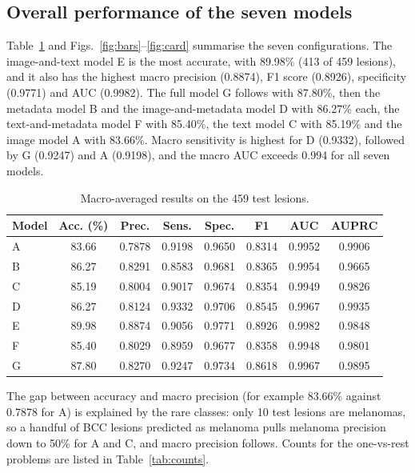 \documentclass[conference]{IEEEtran}
\begin{document}
\subsection{Overall performance of the seven models}
Table~\ref{tab:main} and Figs.~\ref{fig:bars}--\ref{fig:card} summarise the seven configurations. The image-and-text model E is the most accurate, with 89.98\% (413 of 459 lesions), and it also has the highest macro precision (0.8874), F1 score (0.8926), specificity (0.9771) and AUC (0.9982). The full model G follows with 87.80\%, then the metadata model B and the image-and-metadata model D with 86.27\% each, the text-and-metadata model F with 85.40\%, the text model C with 85.19\% and the image model A with 83.66\%. Macro sensitivity is highest for D (0.9332), followed by G (0.9247) and A (0.9198), and the macro AUC exceeds 0.994 for all seven models.

\begin{table}[!t]
\caption{Macro-averaged results on the 459 test lesions.}
\label{tab:main}
\centering\footnotesize
\begin{tabular}{lccccccc}
\toprule
Model & Acc. (\%) & Prec. & Sens. & Spec. & F1 & AUC & AUPRC \\
\midrule
A & 83.66 & 0.7878 & 0.9198 & 0.9650 & 0.8314 & 0.9952 & 0.9906 \\
B & 86.27 & 0.8291 & 0.8583 & 0.9681 & 0.8365 & 0.9954 & 0.9665 \\
C & 85.19 & 0.8004 & 0.9017 & 0.9674 & 0.8354 & 0.9949 & 0.9826 \\
D & 86.27 & 0.8124 & 0.9332 & 0.9706 & 0.8545 & 0.9967 & 0.9935 \\
E & 89.98 & 0.8874 & 0.9056 & 0.9771 & 0.8926 & 0.9982 & 0.9848 \\
F & 85.40 & 0.8029 & 0.8959 & 0.9677 & 0.8358 & 0.9948 & 0.9801 \\
G & 87.80 & 0.8270 & 0.9247 & 0.9734 & 0.8618 & 0.9967 & 0.9895 \\
\bottomrule
\end{tabular}
\end{table}


The gap between accuracy and macro precision (for example 83.66\% against 0.7878 for A) is explained by the rare classes: only 10 test lesions are melanomas, so a handful of BCC lesions predicted as melanoma pulls melanoma precision down to 50\% for A and C, and macro precision follows. Counts for the one-vs-rest problems are listed in Table~\ref{tab:counts}.
\end{document}
